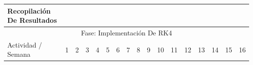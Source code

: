 \documentclass[12pt]{article}
\begin{document}
\begin{table}[H]
{\begin{tabular}{|lllllllllllllllll|}
			\multicolumn{1}{|l|}{Recopilación De Resultados}                                   & \multicolumn{1}{l|}{}                          & \multicolumn{1}{l|}{}                          & \multicolumn{1}{l|}{}                          & \multicolumn{1}{l|}{}                          & \multicolumn{1}{l|}{}                          & \multicolumn{1}{l|}{}                          & \multicolumn{1}{l|}{}                          & \multicolumn{1}{l|}{}                          & \multicolumn{1}{l|}{}                          & \multicolumn{1}{l|}{}                           & \multicolumn{1}{l|}{}                           & \multicolumn{1}{l|}{}                           & \multicolumn{1}{l|}{}                           & \multicolumn{1}{l|}{}                           & \multicolumn{1}{l|}{\cellcolor[HTML]{FFCCC9}}   & \cellcolor[HTML]{FFCCC9}   \\ \hline
			\multicolumn{17}{|c|}{\cellcolor[HTML]{FFFFC7}Fase: Implementación De RK4}                                                                                                                                                                                                                                                                                                                                                                                                                                                                                                                                                                                                                                                                                                                                                                                                           \\ \hline
			\multicolumn{1}{|l|}{\cellcolor[HTML]{FFFFC7}Actividad / Semana}                   & \multicolumn{1}{l|}{\cellcolor[HTML]{9AFF99}1} & \multicolumn{1}{l|}{\cellcolor[HTML]{9AFF99}2} & \multicolumn{1}{l|}{\cellcolor[HTML]{9AFF99}3} & \multicolumn{1}{l|}{\cellcolor[HTML]{9AFF99}4} & \multicolumn{1}{l|}{\cellcolor[HTML]{96FFFB}5} & \multicolumn{1}{l|}{\cellcolor[HTML]{96FFFB}6} & \multicolumn{1}{l|}{\cellcolor[HTML]{96FFFB}7} & \multicolumn{1}{l|}{\cellcolor[HTML]{96FFFB}8} & \multicolumn{1}{l|}{\cellcolor[HTML]{CBCEFB}9} & \multicolumn{1}{l|}{\cellcolor[HTML]{CBCEFB}10} & \multicolumn{1}{l|}{\cellcolor[HTML]{CBCEFB}11} & \multicolumn{1}{l|}{\cellcolor[HTML]{CBCEFB}12} & \multicolumn{1}{l|}{\cellcolor[HTML]{FFCCC9}13} & \multicolumn{1}{l|}{\cellcolor[HTML]{FFCCC9}14} & \multicolumn{1}{l|}{\cellcolor[HTML]{FFCCC9}15} & \cellcolor[HTML]{FFCCC9}16 \\ \hline

\end{tabular}}
\end{table}
\end{document}
